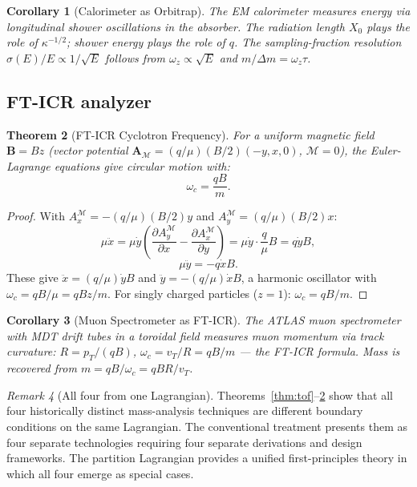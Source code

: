 \documentclass[twocolumn,10pt,a4paper]{article}
\theoremstyle{thmstyle}
\newtheorem{theorem}{Theorem}[section]
\newtheorem{corollary}[theorem]{Corollary}
\theoremstyle{definition}
\theoremstyle{remark}
\newtheorem{remark}[theorem]{Remark}
\newcommand{\AM}{\mathbf{A}_{\mathcal{M}}}
\newcommand{\Mop}{\mathcal{M}}
\begin{document}
\begin{corollary}[Calorimeter as Orbitrap]
The EM calorimeter measures energy via longitudinal shower oscillations
in the absorber. The radiation length $X_0$ plays the role of
$\kappa^{-1/2}$; shower energy plays the role of $q$.
The sampling-fraction resolution $\sigma(E)/E \propto 1/\sqrt{E}$ follows
from $\omega_z \propto \sqrt{E}$ and $m/\Delta m = \omega_z\tau$.
\end{corollary}

\subsection{FT-ICR analyzer}

\begin{theorem}[FT-ICR Cyclotron Frequency]
\label{thm:fticr}
For a uniform magnetic field $\mathbf{B} = B\hat{z}$ (vector potential
$\AM = (q/\mu)(B/2)(-y,x,0)$, $\Mop = 0$), the Euler-Lagrange equations
give circular motion with:
\begin{equation}
\omega_c = \frac{qB}{m}.
\label{eq:fticr}
\end{equation}
\end{theorem}

\begin{proof}
With $A_x^\mathcal{M} = -(q/\mu)(B/2)y$ and $A_y^\mathcal{M} = (q/\mu)(B/2)x$:
\[
\mu\ddot{x} = \mu\dot{y}\left(\frac{\partial A_y^\mathcal{M}}{\partial x}
- \frac{\partial A_x^\mathcal{M}}{\partial y}\right)
= \mu\dot{y}\cdot\frac{q}{\mu}B = q\dot{y}B,
\]
\[
\mu\ddot{y} = -q\dot{x}B.
\]
These give $\ddot{x} = (q/\mu)\dot{y}B$ and $\ddot{y} = -(q/\mu)\dot{x}B$,
a harmonic oscillator with $\omega_c = qB/\mu = qBz/m$.
For singly charged particles ($z = 1$): $\omega_c = qB/m$.
\end{proof}

\begin{corollary}[Muon Spectrometer as FT-ICR]
The ATLAS muon spectrometer with MDT drift tubes in a toroidal field
measures muon momentum via track curvature: $R = p_T/(qB)$,
$\omega_c = v_T/R = qB/m$ --- the FT-ICR formula. Mass is recovered
from $m = qB/\omega_c = qBR/v_T$.
\end{corollary}

\begin{remark}[All four from one Lagrangian]
Theorems~\ref{thm:tof}--\ref{thm:fticr} show that all four historically
distinct mass-analysis techniques are different boundary conditions on
the same Lagrangian. The conventional treatment presents them as four
separate technologies requiring four separate derivations and design
frameworks. The partition Lagrangian provides a unified first-principles
theory in which all four emerge as special cases.
\end{remark}
\end{document}
